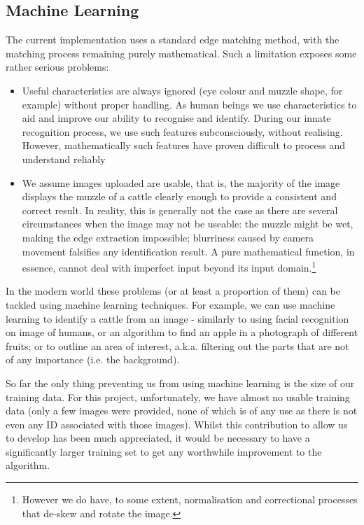 \subsection{Machine Learning}

The current implementation uses a standard edge matching method, with the matching process remaining purely mathematical. Such a limitation exposes some rather serious problems:

\begin{itemize}
	\item Useful characteristics are always ignored (eye colour and muzzle shape, for example) without proper handling. As human beings we use characteristics to aid and improve our ability to recognise and identify. During our innate recognition process, we use such features subconsciously, without realising. However, mathematically such features have proven difficult to process and understand reliably
	\item We assume images uploaded are usable, that is, the majority of the image displays the muzzle of a cattle clearly enough to provide a consistent and correct result. In reality, this is generally not the case as there are several circumstances when the image may not be useable: the muzzle might be wet, making the edge extraction impossible; blurriness caused by camera movement falsifies any identification result. 
		A pure mathematical function, in essence, cannot deal with imperfect input beyond its input domain.\footnote{However we do have, to some extent, normalisation and correctional processes that de-skew and rotate the image.}
\end{itemize}

In the modern world these problems (or at least a proportion of them) can be tackled using machine learning techniques. For example, we can use machine learning to identify a cattle from an image - similarly to using facial recognition on image of humans, or an algorithm to find an apple in a photograph of different fruits; or to outline an area of interest, a.k.a. filtering out the parts that are not of any importance (i.e. the background).

So far the only thing preventing us from using machine learning is the size of our training data. For this project, unfortunately, we have almost no usable training data (only a few images were provided, none of which is of any use as there is not even any ID associated with those images). Whilst this contribution to allow us to develop has been much appreciated, it would be necessary to have a significantly larger training set to get any worthwhile improvement to the algorithm.


